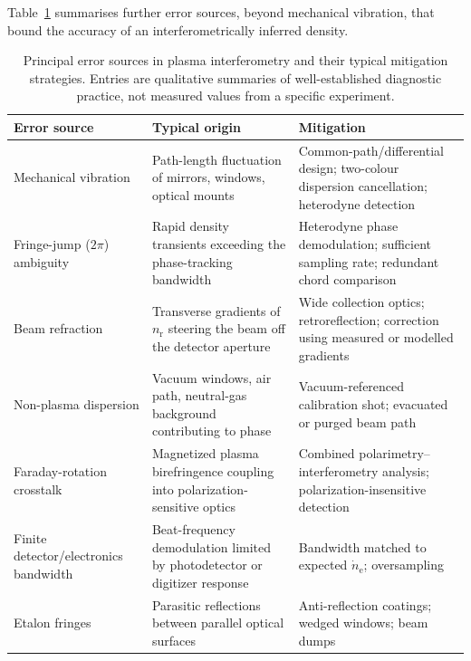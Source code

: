 Table~\ref{tab:errors} summarises further error sources, beyond mechanical vibration, that bound the accuracy of an interferometrically inferred density.

\begin{table}[htbp]
\centering
\caption{Principal error sources in plasma interferometry and their typical mitigation strategies. Entries are qualitative summaries of well-established diagnostic practice, not measured values from a specific experiment.}
\label{tab:errors}
\begin{tabularx}{\textwidth}{@{}l X X@{}}
\toprule
Error source & Typical origin & Mitigation \\
\midrule
Mechanical vibration & Path-length fluctuation of mirrors, windows, optical mounts & Common-path/differential design; two-colour dispersion cancellation; heterodyne detection \\
Fringe-jump ($2\pi$) ambiguity & Rapid density transients exceeding the phase-tracking bandwidth & Heterodyne phase demodulation; sufficient sampling rate; redundant chord comparison \\
Beam refraction & Transverse gradients of $n_{\mathrm{r}}$ steering the beam off the detector aperture & Wide collection optics; retroreflection; correction using measured or modelled gradients \\
Non-plasma dispersion & Vacuum windows, air path, neutral-gas background contributing to phase & Vacuum-referenced calibration shot; evacuated or purged beam path \\
Faraday-rotation crosstalk & Magnetized plasma birefringence coupling into polarization-sensitive optics & Combined polarimetry--interferometry analysis; polarization-insensitive detection \\
Finite detector/electronics bandwidth & Beat-frequency demodulation limited by photodetector or digitizer response & Bandwidth matched to expected $\dot{n}_{\mathrm{e}}$; oversampling \\
Etalon fringes & Parasitic reflections between parallel optical surfaces & Anti-reflection coatings; wedged windows; beam dumps \\
\bottomrule
\end{tabularx}
\end{table}

